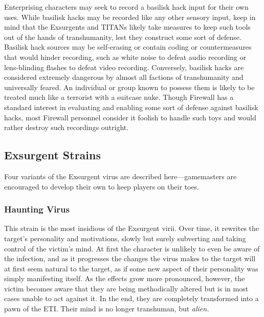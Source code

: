 Enterprising characters may seek to record a basilisk 
hack input for their own uses. While basilisk hacks may 
be recorded like any other sensory input, keep in mind 
that the Exsurgents and TITANs likely take measures 
to keep such tools out of the hands of transhumanity, 
lest they construct some sort of defense. Basilisk hack 
sources may be self-erasing or contain coding or countermeasures
that would hinder recording, such as white
noise to defeat audio recording or lens-blinding flashes 
to defeat video recording. Conversely, basilisk hacks are 
considered extremely dangerous by almost all factions 
of transhumanity and universally feared. An individual 
or group known to possess them is likely to be treated 
much like a terrorist with a suitcase nuke. Though 
Firewall has a standard interest in evaluating and enabling
some sort of defense against basilisk hacks, most
Firewall personnel consider it foolish to handle such 
toys and would rather destroy such recordings outright.

\subsection{Exsurgent Strains}

Four variants of the Exsurgent virus are described 
here—gamemasters are encouraged to develop their 
own to keep players on their toes.

\subsubsection{Haunting Virus}

This strain is the most insidious of the Exsurgent virii. 
Over time, it rewrites the target's personality and 
motivations, slowly but surely subverting and taking 
control of the victim's mind. At first the character is 
unlikely to even be aware of the infection, and as it 
progresses the changes the virus makes to the target 
will at first seem natural to the target, as if some new 
aspect of their personality was simply manifesting 
itself. As the effects grow more pronounced, however, 
the victim becomes aware that they are being methodically
altered but is in most cases unable to act against
it. In the end, they are completely transformed into a 
pawn of the ETI. Their mind is no longer transhuman, 
but \textit{alien.}

